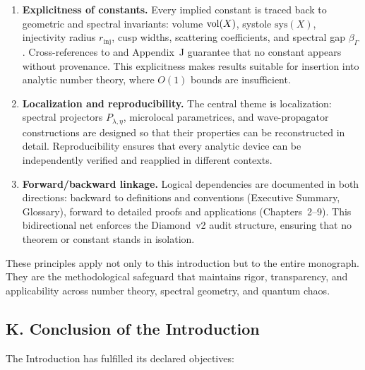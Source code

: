 \begin{enumerate}[label=\arabic*.]
  \item \textbf{Explicitness of constants.}
  Every implied constant is traced back to geometric and spectral invariants:
  volume $\operatorname{vol}(X)$, systole $\mathrm{sys}(X)$, injectivity radius $r_{\mathrm{inj}}$,
  cusp widths, scattering coefficients, and spectral gap $\beta_\Gamma$.
  Cross-references to  and Appendix~J guarantee that
  no constant appears without provenance.
  This explicitness makes results suitable for insertion into analytic number theory,
  where $O(1)$ bounds are insufficient.

  \item \textbf{Localization and reproducibility.}
  The central theme is localization:
  spectral projectors $P_{\lambda,\eta}$, microlocal parametrices,
  and wave-propagator constructions are designed so that
  their properties can be reconstructed in detail.
  Reproducibility ensures that every analytic device
  can be independently verified and reapplied in different contexts.

  \item \textbf{Forward/backward linkage.}
  Logical dependencies are documented in both directions:
  backward to definitions and conventions (Executive Summary, Glossary),
  forward to detailed proofs and applications (Chapters~2–9).
  This bidirectional net enforces the Diamond~v2 audit structure,
  ensuring that no theorem or constant stands in isolation.
\end{enumerate}

These principles apply not only to this introduction but to the entire monograph.
They are the methodological safeguard that maintains rigor, transparency, and
applicability across number theory, spectral geometry, and quantum chaos.

\subsection*{K. Conclusion of the Introduction}

The Introduction has fulfilled its declared objectives:

